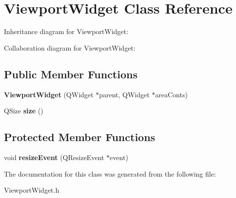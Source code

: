 \hypertarget{class_viewport_widget}{\section{Viewport\-Widget Class Reference}
\label{class_viewport_widget}
}


Inheritance diagram for Viewport\-Widget\-:


Collaboration diagram for Viewport\-Widget\-:
\subsection*{Public Member Functions}
\begin{DoxyCompactItemize}
\item 
\hypertarget{class_viewport_widget_a0012361ba2ffd4983794291422db7e7a}{{\bfseries Viewport\-Widget} (Q\-Widget $\ast$parent, Q\-Widget $\ast$area\-Conts)}\label{class_viewport_widget_a0012361ba2ffd4983794291422db7e7a}

\item 
\hypertarget{class_viewport_widget_a207a42f641caf95552b0352a458f8447}{Q\-Size {\bfseries size} ()}\label{class_viewport_widget_a207a42f641caf95552b0352a458f8447}

\end{DoxyCompactItemize}
\subsection*{Protected Member Functions}
\begin{DoxyCompactItemize}
\item 
\hypertarget{class_viewport_widget_a319e0b4792e88f86ce11da6ae415930c}{void {\bfseries resize\-Event} (Q\-Resize\-Event $\ast$event)}\label{class_viewport_widget_a319e0b4792e88f86ce11da6ae415930c}

\end{DoxyCompactItemize}


The documentation for this class was generated from the following file\-:\begin{DoxyCompactItemize}
\item 
Viewport\-Widget.\-h\end{DoxyCompactItemize}
